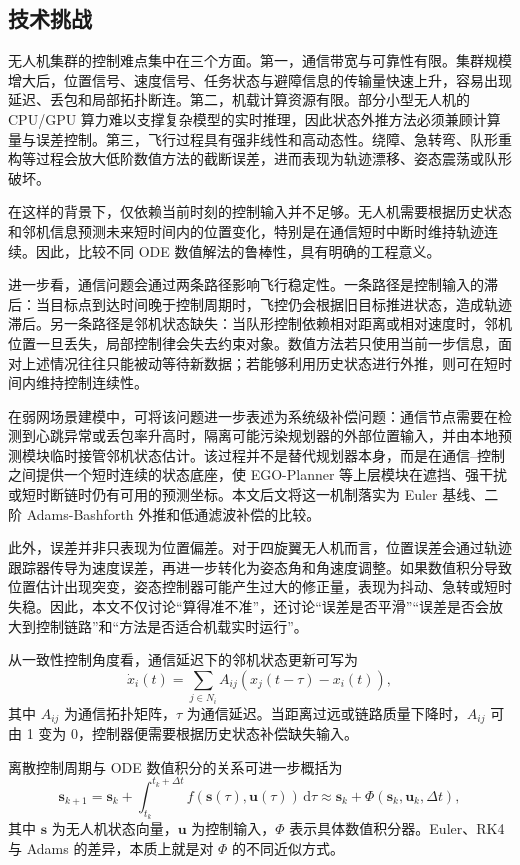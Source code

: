 \documentclass[UTF8,zihao=-4]{ctexart}
\newcommand{\diff}{\mathrm{d}}
\begin{document}
\subsection{技术挑战}
无人机集群的控制难点集中在三个方面。第一，通信带宽与可靠性有限。集群规模增大后，位置信号、速度信号、任务状态与避障信息的传输量快速上升，容易出现延迟、丢包和局部拓扑断连。第二，机载计算资源有限。部分小型无人机的 CPU/GPU 算力难以支撑复杂模型的实时推理，因此状态外推方法必须兼顾计算量与误差控制。第三，飞行过程具有强非线性和高动态性。绕障、急转弯、队形重构等过程会放大低阶数值方法的截断误差，进而表现为轨迹漂移、姿态震荡或队形破坏。

在这样的背景下，仅依赖当前时刻的控制输入并不足够。无人机需要根据历史状态和邻机信息预测未来短时间内的位置变化，特别是在通信短时中断时维持轨迹连续。因此，比较不同 ODE 数值解法的鲁棒性，具有明确的工程意义。

进一步看，通信问题会通过两条路径影响飞行稳定性。一条路径是控制输入的滞后：当目标点到达时间晚于控制周期时，飞控仍会根据旧目标推进状态，造成轨迹滞后。另一条路径是邻机状态缺失：当队形控制依赖相对距离或相对速度时，邻机位置一旦丢失，局部控制律会失去约束对象。数值方法若只使用当前一步信息，面对上述情况往往只能被动等待新数据；若能够利用历史状态进行外推，则可在短时间内维持控制连续性。

在弱网场景建模中，可将该问题进一步表述为系统级补偿问题：通信节点需要在检测到心跳异常或丢包率升高时，隔离可能污染规划器的外部位置输入，并由本地预测模块临时接管邻机状态估计。该过程并不是替代规划器本身，而是在通信--控制之间提供一个短时连续的状态底座，使 EGO-Planner 等上层模块在遮挡、强干扰或短时断链时仍有可用的预测坐标。本文后文将这一机制落实为 Euler 基线、二阶 Adams-Bashforth 外推和低通滤波补偿的比较。

此外，误差并非只表现为位置偏差。对于四旋翼无人机而言，位置误差会通过轨迹跟踪器传导为速度误差，再进一步转化为姿态角和角速度调整。如果数值积分导致位置估计出现突变，姿态控制器可能产生过大的修正量，表现为抖动、急转或短时失稳。因此，本文不仅讨论“算得准不准”，还讨论“误差是否平滑”“误差是否会放大到控制链路”和“方法是否适合机载实时运行”。

从一致性控制角度看，通信延迟下的邻机状态更新可写为
\begin{equation}
  \dot{x}_i(t)=\sum_{j\in N_i} A_{ij}\left(x_j(t-\tau)-x_i(t)\right),
  \label{eq:consensus-intro}
\end{equation}
其中 $A_{ij}$ 为通信拓扑矩阵，$\tau$ 为通信延迟。当距离过远或链路质量下降时，$A_{ij}$ 可由 1 变为 0，控制器便需要根据历史状态补偿缺失输入。

离散控制周期与 ODE 数值积分的关系可进一步概括为
\begin{equation}
  \bm s_{k+1}=\bm s_k+\int_{t_k}^{t_k+\Delta t}f(\bm s(\tau),\bm u(\tau))\,\diff\tau
  \approx \bm s_k+\Phi(\bm s_k,\bm u_k,\Delta t),
  \label{eq:discrete-control-integral}
\end{equation}
其中 $\bm s$ 为无人机状态向量，$\bm u$ 为控制输入，$\Phi$ 表示具体数值积分器。Euler、RK4 与 Adams 的差异，本质上就是对 $\Phi$ 的不同近似方式。
\end{document}
